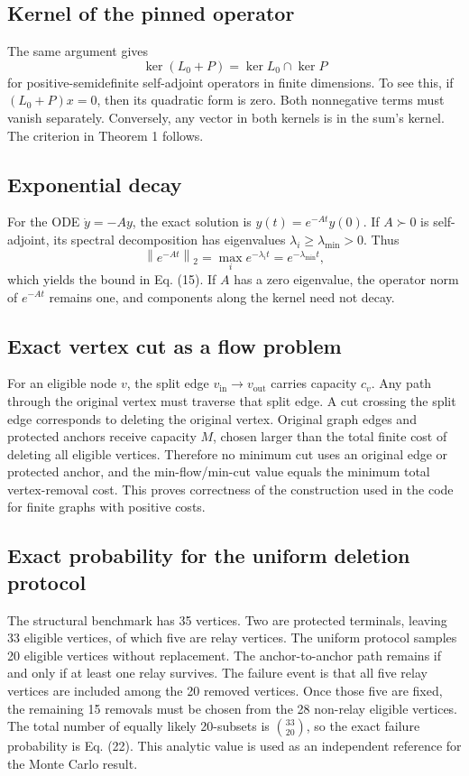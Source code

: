 \documentclass[12pt,a4paper]{article}
\newcommand{\norm}[1]{\left\lVert #1 \right\rVert}
\begin{document}
\subsection{Kernel of the pinned operator}
The same argument gives
\[
\ker(L_0+P)=\ker L_0\cap\ker P
\]
for positive-semidefinite self-adjoint operators in finite dimensions. To see this, if \((L_0+P)x=0\), then its quadratic form is zero. Both nonnegative terms must vanish separately. Conversely, any vector in both kernels is in the sum's kernel. The criterion in Theorem 1 follows.

\subsection{Exponential decay}
For the ODE \(\dot y=-Ay\), the exact solution is \(y(t)=e^{-At}y(0)\). If \(A\succ0\) is self-adjoint, its spectral decomposition has eigenvalues \(\lambda_i\geq\lambda_{\min}>0\). Thus
\[
\norm{e^{-At}}_2=\max_i e^{-\lambda_i t}=e^{-\lambda_{\min}t},
\]
which yields the bound in Eq. (15). If \(A\) has a zero eigenvalue, the operator norm of \(e^{-At}\) remains one, and components along the kernel need not decay.

\subsection{Exact vertex cut as a flow problem}
For an eligible node \(v\), the split edge \(v_{\mathrm{in}}\to v_{\mathrm{out}}\) carries capacity \(c_v\). Any path through the original vertex must traverse that split edge. A cut crossing the split edge corresponds to deleting the original vertex. Original graph edges and protected anchors receive capacity \(M\), chosen larger than the total finite cost of deleting all eligible vertices. Therefore no minimum cut uses an original edge or protected anchor, and the min-flow/min-cut value equals the minimum total vertex-removal cost. This proves correctness of the construction used in the code for finite graphs with positive costs.

\subsection{Exact probability for the uniform deletion protocol}
The structural benchmark has 35 vertices. Two are protected terminals, leaving 33 eligible vertices, of which five are relay vertices. The uniform protocol samples 20 eligible vertices without replacement. The anchor-to-anchor path remains if and only if at least one relay survives. The failure event is that all five relay vertices are included among the 20 removed vertices. Once those five are fixed, the remaining 15 removals must be chosen from the 28 non-relay eligible vertices. The total number of equally likely 20-subsets is \(\binom{33}{20}\), so the exact failure probability is Eq. (22). This analytic value is used as an independent reference for the Monte Carlo result.
\end{document}
